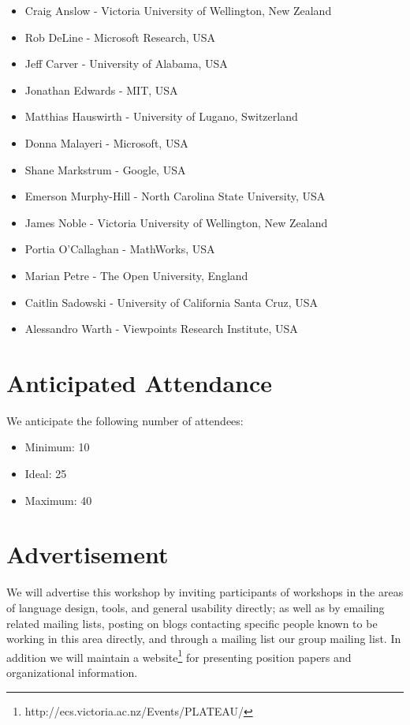\documentclass{sigplanconf}
\begin{document}
\begin{itemize}
\item  Craig Anslow - Victoria University of Wellington, New Zealand
\item  Rob DeLine - Microsoft Research, USA
\item Jeff Carver - University of Alabama, USA
\item Jonathan Edwards - MIT, USA
\item Matthias Hauswirth - University of Lugano, Switzerland
\item Donna Malayeri - Microsoft, USA
\item Shane Markstrum - Google, USA
\item  Emerson Murphy-Hill - North Carolina State University, USA
\item James Noble - Victoria University of Wellington, New Zealand
\item Portia O'Callaghan - MathWorks, USA
\item Marian Petre - The Open University, England
\item Caitlin Sadowski - University of California Santa Cruz, USA
\item  Alessandro Warth - Viewpoints Research Institute, USA 
\end{itemize}


\section{Anticipated Attendance}

We anticipate the following number of attendees:

\begin{itemize}
\item Minimum: 10 
\item Ideal: 25
\item Maximum: 40 
\end{itemize}

\section{Advertisement}

We will advertise this workshop by inviting participants of workshops
in the areas of language design, tools, and general usability
directly; as well as by emailing related mailing lists, posting on
blogs contacting specific people known to be working in this area directly,
and through a mailing list our group mailing list. In addition we will maintain a website\footnote{http://ecs.victoria.ac.nz/Events/PLATEAU/} for presenting position papers and organizational information.
\end{document}
